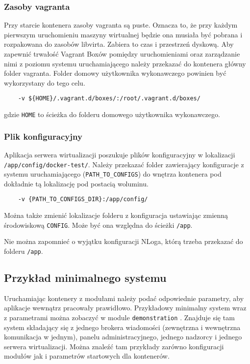 \documentclass[../opis-rozwiazania.tex]{subfiles}
\begin{document}
\subsubsection{Zasoby vagranta}
Przy starcie kontenera zasoby vagranta są puste.
Oznacza to, że przy każdym pierwszym uruchomieniu maszyny wirtualnej będzie ona musiała być pobrana i rozpakowana do zasobów libvirta.
Zabiera to czas i przestrzeń dyskową.
Aby zapewnić trwałość Vagrant Boxów pomiędzy uruchomieniami oraz zarządzanie nimi z poziomu systemu uruchamiającego należy przekazać do kontenera główny folder vagranta.
Folder domowy użytkownika wykonawczego powinien być wykorzystany do tego celu.

\begin{verbatim}
	-v ${HOME}/.vagrant.d/boxes/:/root/.vagrant.d/boxes/
\end{verbatim}
gdzie \texttt{HOME} to ścieżka do folderu domowego użytkownika wykonawczego.

\subsubsection{Plik konfiguracyjny}
Aplikacja serwera wirtualizacji poszukuje plików konfiguracyjny w lokalizacji \texttt{/app/config/docker-test/}.
Należy przekazać folder zawierający konfiguracje z systemu uruchamiającego (\texttt{PATH\_TO\_CONFIGS}) do wnętrza kontenera pod dokładnie tą lokalizację pod postacią woluminu.
\begin{verbatim}
	-v {PATH_TO_CONFIGS_DIR}:/app/config/
\end{verbatim}

Można także zmienić lokalizacje folderu z konfiguracja ustawiając zmienną środowiskową \texttt{CONFIG}.
Może być ona względna do ścieżki \texttt{/app}.

Nie można zapomnieć o wyjątku konfiguracji NLoga, którą trzeba przekazać do folderu \texttt{/app}.

\subsection{Przykład minimalnego systemu}
Uruchamiając kontenery z modułami należy podać odpowiednie parametry, aby aplikacje wewnątrz pracowały prawidłowo.
Przykładowy minimalny system wraz z parametrami można zobaczyć w module \texttt{demonstration} \parencite{ocd-demo}.
Znajduje się tam system składający się z jednego brokera wiadomości (zewnętrzna i wewnętrzna komunikacja w jednym), panelu administracyjnego, jednego nadzorcy i jednego serwera wirtualizacji.
Można znaleźć tam przykłady zarówno konfiguracji modułów jak i parametrów startowych dla kontenerów.
\end{document}

